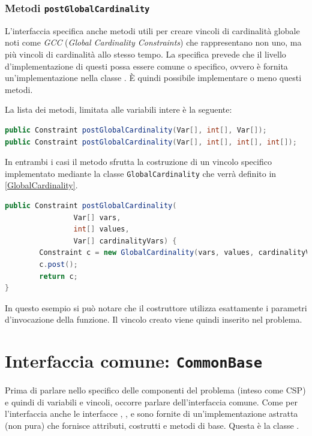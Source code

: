 \subsubsection{Metodi \texttt{postGlobalCardinality}}
L'interfaccia  specifica anche metodi utili per creare vincoli
di cardinalità globale noti come \emph{GCC} (\emph{Global Cardinality 
Constraints}) che rappresentano non uno, ma più
vincoli di cardinalità allo stesso tempo. La specifica prevede che il livello
d'implementazione di questi possa essere comune o specifico, ovvero è 
fornita un'implementazione nella classe . \`E quindi
possibile implementare o meno questi metodi. 

La lista dei metodi, limitata alle variabili intere è la seguente:
\begin{lstlisting}[language = Java, frame = single]
public Constraint postGlobalCardinality(Var[], int[], Var[]);
public Constraint postGlobalCardinality(Var[], int[], int[], int[]);
\end{lstlisting}

In entrambi i casi il metodo sfrutta la costruzione di un vincolo
specifico implementato mediante la classe \texttt{GlobalCardinality} che verrà
definito in \ref{GlobalCardinality}.

\begin{lstlisting}[language = Java,
                   caption = {\files{postGlobalcardinality}.}]
public Constraint postGlobalCardinality(
                Var[] vars, 
                int[] values, 
                Var[] cardinalityVars) {
        Constraint c = new GlobalCardinality(vars, values, cardinalityVars);
        c.post();
        return c;
}
\end{lstlisting}
In questo esempio si può notare che il costruttore utilizza esattamente i 
parametri d'invocazione della funzione. Il vincolo creato viene quindi inserito
nel problema.

\section{Interfaccia comune: \texttt{CommonBase}}\label{common}
Prima di parlare nello specifico delle componenti del problema (inteso come CSP)
e quindi di variabili e vincoli, occorre parlare dell'interfaccia comune.
Come per l'interfaccia  anche le interfacce ,
,  e  sono fornite di
un'implementazione astratta (non pura) che fornisce attributi, costrutti e 
metodi di base. Questa è la classe .

